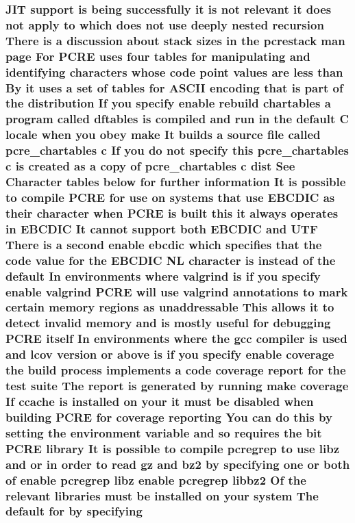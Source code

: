 \subsubsection[{\texorpdfstring{specifying}{specifying}}]{ J\+IT {\bf support} {\bf is} being successfully {\bf it} {\bf is} {\bf not} relevant {\bf it} does {\bf not} apply {\bf to} {\bf which} does {\bf not} use deeply nested {\bf recursion} There {\bf is} {\bf a} discussion about {\bf stack} sizes {\bf in} the pcrestack {\bf man} page For {\bf P\+C\+RE} uses four {\bf tables} for manipulating and identifying {\bf characters} whose {\bf code} {\bf point} {\bf values} {\bf are} less {\bf than} By {\bf it} uses {\bf a} {\bf set} {\bf of} {\bf tables} for {\bf A\+S\+C\+II} {\bf encoding} that {\bf is} part {\bf of} the distribution If you specify enable rebuild {\bf chartables} {\bf a} {\bf program} called {\bf dftables} {\bf is} {\bf compiled} and {\bf run} {\bf in} the {\bf default} {\bf C} {\bf locale} when you obey {\bf make} It builds {\bf a} {\bf source} {\bf file} called pcre\+\_\+chartables {\bf c} If you {\bf do} {\bf not} specify {\bf this} pcre\+\_\+chartables {\bf c} {\bf is} created {\bf as} {\bf a} copy {\bf of} pcre\+\_\+chartables {\bf c} {\bf dist} See Character {\bf tables} {\bf below} for further information It {\bf is} {\bf possible} {\bf to} {\bf compile} {\bf P\+C\+RE} for use {\bf on} {\bf systems} that use E\+B\+C\+D\+IC {\bf as} their {\bf character} when {\bf P\+C\+RE} {\bf is} {\bf built} {\bf this} {\bf it} always operates {\bf in} E\+B\+C\+D\+IC It cannot {\bf support} both E\+B\+C\+D\+IC and U\+TF There {\bf is} {\bf a} {\bf second} enable ebcdic {\bf which} specifies that the {\bf code} {\bf value} for the E\+B\+C\+D\+IC {\bf NL} {\bf character} {\bf is} instead {\bf of} the {\bf default} In {\bf environments} {\bf where} valgrind {\bf is} {\bf if} you specify enable valgrind {\bf P\+C\+RE} will use valgrind annotations {\bf to} {\bf mark} certain {\bf memory} regions {\bf as} unaddressable This allows {\bf it} {\bf to} detect invalid {\bf memory} and {\bf is} mostly useful for debugging {\bf P\+C\+RE} {\bf itself} In {\bf environments} {\bf where} the {\bf gcc} {\bf compiler} {\bf is} {\bf used} and lcov version {\bf or} {\bf above} {\bf is} {\bf if} you specify enable coverage the build {\bf process} implements {\bf a} {\bf code} coverage report for the test suite The report {\bf is} {\bf generated} by running {\bf make} coverage If ccache {\bf is} {\bf installed} {\bf on} your {\bf it} must {\bf be} disabled when building {\bf P\+C\+RE} for coverage reporting You {\bf can} {\bf do} {\bf this} by {\bf setting} the {\bf environment} variable and {\bf so} requires the {\bf bit} {\bf P\+C\+RE} {\bf library} It {\bf is} {\bf possible} {\bf to} {\bf compile} pcregrep {\bf to} use libz and {\bf or} {\bf in} {\bf order} {\bf to} {\bf read} gz and {\bf bz2} by specifying one {\bf or} both {\bf of} enable pcregrep libz enable pcregrep {\bf libbz2} Of the relevant {\bf libraries} must {\bf be} {\bf installed} {\bf on} your {\bf system} The {\bf default} for by specifying}\hypertarget{README_8txt_a558ffd20b248e945fc80d5b991175022}{}\label{README_8txt_a558ffd20b248e945fc80d5b991175022}
